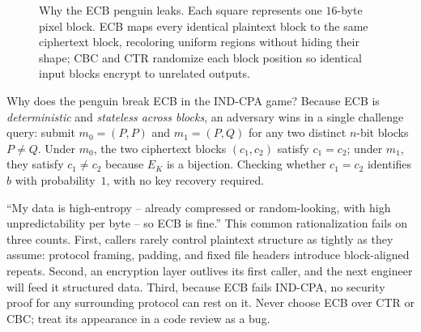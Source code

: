 \begin{figure}[htbp]
\caption{Why the ECB penguin leaks. Each square represents one $16$-byte pixel block. ECB maps every identical plaintext block to the same ciphertext block, recoloring uniform regions without hiding their shape; CBC and CTR randomize each block position so identical input blocks encrypt to unrelated outputs.}
\label{ch13:fig-ecb-penguin}
\end{figure}

Why does the penguin break ECB in the IND-CPA game? Because ECB is \emph{deterministic} and \emph{stateless across blocks}, an adversary wins in a single challenge query: submit $m_0 = (P, P)$ and $m_1 = (P, Q)$ for any two distinct $n$-bit blocks $P \ne Q$. Under $m_0$, the two ciphertext blocks $(c_1, c_2)$ satisfy $c_1 = c_2$; under $m_1$, they satisfy $c_1 \ne c_2$ because $E_K$ is a bijection. Checking whether $c_1 = c_2$ identifies $b$ with probability~$1$, with no key recovery required.

\begin{trapbox}
``My data is high-entropy -- already compressed or random-looking, with high unpredictability per byte -- so ECB is fine.'' This common rationalization fails on three counts. First, callers rarely control plaintext structure as tightly as they assume: protocol framing, padding, and fixed file headers introduce block-aligned repeats. Second, an encryption layer outlives its first caller, and the next engineer will feed it structured data. Third, because ECB fails IND-CPA, no security proof for any surrounding protocol can rest on it. Never choose ECB over CTR or CBC; treat its appearance in a code review as a bug.
\end{trapbox}

